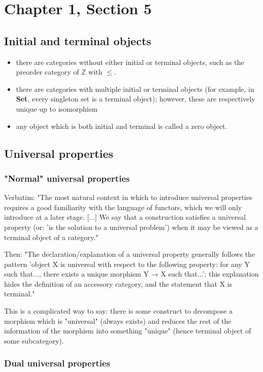 \chapter*{Chapter 1, Section 5}

\section*{Initial and terminal objects}

\begin{itemize}
	\item there are categories without either initial or terminal objects, such as the preorder category of $\mathbb{Z}$ with $\leq$.
	\item there are categories with multiple initial or terminal objects (for example, in \textbf{Set}, every singleton set is a terminal object); however, these are respectively unique up to isomorphism
	\item any object which is both initial and terminal is called a zero object.
\end{itemize}

\section*{Universal properties}

\subsection*{"Normal" universal properties}

Verbatim: "The most natural context in which to introduce universal properties requires a good familiarity with the language of functors, which we will only introduce at a later stage. [...] We say that a construction satisﬁes a universal property (or: 'is the solution to a universal problem') when it may be viewed as a terminal object of a category."

Then: "The declaration/explanation of a universal property generally follows the pattern 'object X is universal with respect to the following property: for any Y such that..., there exists a unique morphism Y → X such that...'; this explanation hides the deﬁnition of an accessory category, and the statement that X is terminal."

This is a complicated way to say: there is some construct to decompose a morphism which is "universal" (always exists) and reduces the rest of the information of the morphism into something "unique" (hence terminal object of some subcategory).


\subsection*{Dual universal properties}

